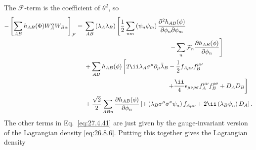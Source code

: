 The \(\mathcal{F}\)-term is the coefficient of \(\theta^2\), so
\[
  \begin{aligned}
  -\left[
    \sum_{AB}h_{AB}(\Phi)
    W_A^\alpha W_{B\alpha}
  \right]_{\mathcal{F}}
  ={}&
  \sum_{AB}\left(\lambda_A\lambda_B\right)
  \left[
    \frac12\sum_{nm}
      \left(\psi_n\psi_m\right)
      \frac{\partial^2h_{AB}(\phi)}
           {\partial\phi_n\partial\phi_m}
  \right.
  \\
  &\hspace{48mm}\left.
    -\sum_n\mathcal{F}_n
      \frac{\partial h_{AB}(\phi)}{\partial\phi_n}
  \right]
  \\
  &+\sum_{AB}h_{AB}(\phi)
  \left[
    2\ii\lambda_A\sigma^\mu\partial_\mu\bar\lambda_B
    -\frac12f_{A\mu\nu}f_B^{\mu\nu}
  \right.
  \\
  &\hspace{47mm}\left.
    +\frac{\ii}{4}\epsilon_{\mu\nu\rho\sigma}
      f_A^{\mu\nu}f_B^{\rho\sigma}
    +D_AD_B
  \right]
  \\
  &+\frac{\sqrt{2}}2\sum_{ABn}
  \frac{\partial h_{AB}(\phi)}{\partial\phi_n}
  \left[
    +\left(\lambda_B\sigma^\mu\bar\sigma^\nu\psi_n\right)f_{A\mu\nu}
    +2\ii\left(\lambda_B\psi_n\right)D_A
  \right].
  \end{aligned}
\]
The other terms in Eq.~\eqref{eq:27.4.41} are just given by the
gauge-invariant version of the Lagrangian density \eqref{eq:26.8.6}. Putting
this together gives the Lagrangian density
